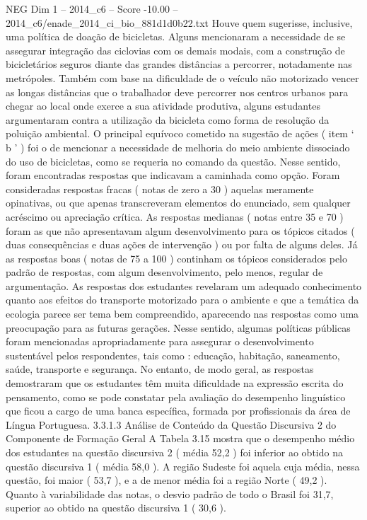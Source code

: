 \begin{textsample}{NEG Dim 1 – 2014\_c6 – Score -10.00 – 2014\_c6/enade\_2014\_ci\_bio\_881d1d0b22.txt}
Houve quem sugerisse, inclusive, uma política de doação de bicicletas.
Alguns mencionaram a necessidade de se assegurar integração das ciclovias com os demais modais, com a construção de bicicletários seguros diante das grandes distâncias a percorrer, notadamente nas metrópoles.
Também com base na dificuldade de o veículo não motorizado vencer as longas distâncias que o trabalhador deve percorrer nos centros urbanos para chegar ao local onde exerce a sua atividade produtiva, alguns estudantes argumentaram contra a utilização da bicicleta como forma de resolução da poluição ambiental.
O principal equívoco cometido na sugestão de ações ( item ‘ b ’ ) foi o de mencionar a necessidade de melhoria do meio ambiente dissociado do uso de bicicletas, como se requeria no comando da questão.
Nesse sentido, foram encontradas respostas que indicavam a caminhada como opção.
Foram consideradas respostas fracas ( notas de zero a 30 ) aquelas meramente opinativas, ou que apenas transcreveram elementos do enunciado, sem qualquer acréscimo ou apreciação crítica.
As respostas medianas ( notas entre 35 e 70 ) foram as que não apresentavam algum desenvolvimento para os tópicos citados ( duas consequências e duas ações de intervenção ) ou por falta de alguns deles.
Já as respostas boas ( notas de 75 a 100 ) continham os tópicos considerados pelo padrão de respostas, com algum desenvolvimento, pelo menos, regular de argumentação.
As respostas dos estudantes revelaram um adequado conhecimento quanto aos efeitos do transporte motorizado para o ambiente e que a temática da ecologia parece ser tema bem compreendido, aparecendo nas respostas como uma preocupação para as futuras gerações.
Nesse sentido, algumas políticas públicas foram mencionadas apropriadamente para assegurar o desenvolvimento sustentável pelos respondentes, tais como : educação, habitação, saneamento, saúde, transporte e segurança.
No entanto, de modo geral, as respostas demostraram que os estudantes têm muita dificuldade na expressão escrita do pensamento, como se pode constatar pela avaliação do desempenho linguístico que ficou a cargo de uma banca específica, formada por profissionais da área de Língua Portuguesa. 3.3.1.3 Análise de Conteúdo da Questão Discursiva 2 do Componente de Formação Geral A Tabela 3.15 mostra que o desempenho médio dos estudantes na questão discursiva 2 ( média 52,2 ) foi inferior ao obtido na questão discursiva 1 ( média 58,0 ).
A região Sudeste foi aquela cuja média, nessa questão, foi maior ( 53,7 ), e a de menor média foi a região Norte ( 49,2 ).
Quanto à variabilidade das notas, o desvio padrão de todo o Brasil foi 31,7, superior ao obtido na questão discursiva 1 ( 30,6 ).

\end{textsample}
